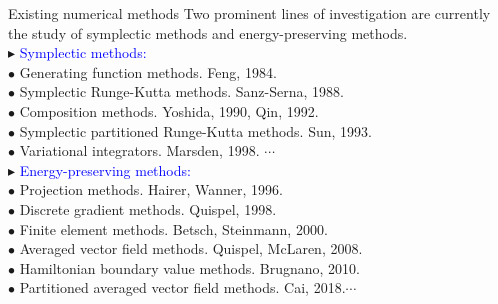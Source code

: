 \documentclass[10pt]{beamer}
\begin{document}
\begin{frame}{Existing numerical methods}
Two prominent lines of investigation are currently the study of symplectic methods and energy-preserving methods.\\
\vspace{2mm}
\textcolor[rgb]{0,0,1}{$\blacktriangleright$} \textcolor{blue}{Symplectic methods:}\\
\quad\textcolor[rgb]{0,0,1}{$\bullet$} Generating function methods. Feng, 1984.\\
\quad\textcolor[rgb]{0,0,1}{$\bullet$} Symplectic Runge-Kutta methods. Sanz-Serna, 1988.\\
\quad\textcolor[rgb]{0,0,1}{$\bullet$} Composition methods. Yoshida, 1990, Qin, 1992.\\
\quad\textcolor[rgb]{0,0,1}{$\bullet$} Symplectic partitioned Runge-Kutta methods. Sun, 1993.\\
\quad\textcolor[rgb]{0,0,1}{$\bullet$} Variational integrators. Marsden, 1998. $\cdots$\\
\vspace{2mm}
\textcolor[rgb]{0,0,1}{$\blacktriangleright$} \textcolor{blue}{Energy-preserving methods:}\\
\quad\textcolor[rgb]{0,0,1}{$\bullet$} Projection methods. Hairer, Wanner, 1996.\\
\quad\textcolor[rgb]{0,0,1}{$\bullet$} Discrete gradient methods. Quispel, 1998.\\
\quad\textcolor[rgb]{0,0,1}{$\bullet$} Finite element methods. Betsch, Steinmann, 2000.\\
\quad\textcolor[rgb]{0,0,1}{$\bullet$} Averaged vector field methods. Quispel, McLaren, 2008.\\
\quad\textcolor[rgb]{0,0,1}{$\bullet$} Hamiltonian boundary value methods. Brugnano, 2010.\\
\quad\textcolor[rgb]{0,0,1}{$\bullet$} Partitioned averaged vector field methods. Cai, 2018.$\cdots$\\
\end{frame}	
\end{document}
